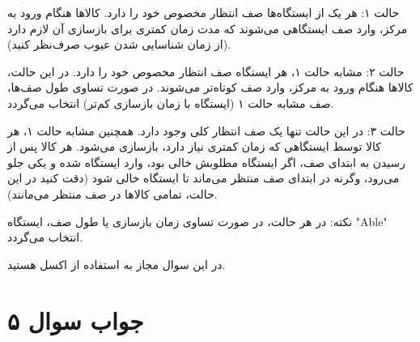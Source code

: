 حالت ۱: هر یک از ایستگاه‌ها صف انتظار مخصوص خود را دارد. کالاها هنگام ورود به مرکز، وارد صف ایستگاهی می‌شوند که مدت زمان کمتری برای بازسازی آن لازم دارد (از زمان شناسایی شدن عیوب صرف‌نظر کنید).

حالت ۲: مشابه حالت ۱، هر ایستگاه صف انتظار مخصوص خود را دارد. در این حالت، کالاها هنگام ورود به مرکز، وارد صف کوتاه‌تر می‌شوند. در صورت تساوی طول صف‌ها، صف مشابه حالت ۱ (ایستگاه با زمان بازسازی کم‌تر) انتخاب می‌گردد.

حالت ۳: در این حالت تنها یک صف انتظار کلی وجود دارد. همچنین مشابه حالت ۱، هر کالا توسط ایستگاهی که زمان کمتری نیاز دارد، بازسازی می‌شود. هر کالا پس از رسیدن به ابتدای صف، اگر ایستگاه مطلوبش خالی بود، وارد ایستگاه شده و یکی جلو می‌رود، وگرنه در ابتدای صف منتظر می‌ماند تا ایستگاه خالی شود (دقت کنید در این حالت، تمامی کالاها در صف منتظر می‌مانند).

نکته: در هر حالت، در صورت تساوی زمان بازسازی یا طول صف، ایستگاه "Able" انتخاب می‌گردد.

در این سوال مجاز به استفاده از اکسل هستید.

\section*{جواب سوال ۵}
